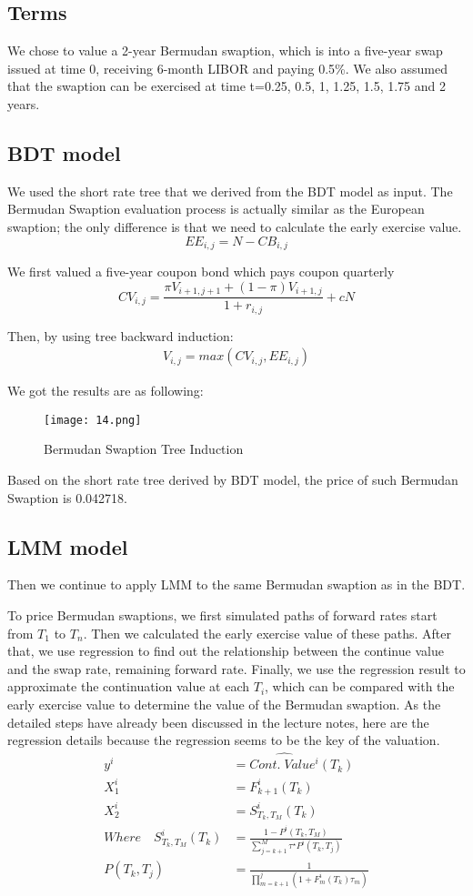 \documentclass[paper = letterpaper, fontsize=12pt]{article}
\begin{document}
\subsection{Terms}
We chose to value a 2-year Bermudan swaption, which is into a five-year swap issued at time 0, receiving 6-month LIBOR and paying 0.5\%. We also assumed that the swaption can be exercised at time t=0.25, 0.5, 1, 1.25, 1.5, 1.75 and 2 years.
\subsection{BDT model}
We used the short rate tree that we derived from the BDT model as input. The Bermudan Swaption evaluation process is actually similar as the European swaption; the only difference is that we need to calculate the early exercise value. 
\[
EE_{i, j} =  N - CB_{i, j}
\]

We first valued a five-year coupon bond which pays coupon quarterly 
\[
CV_{i, j} = \frac{\pi V_{i+1, j+1} + (1-\pi)V_{i+1,j}}{1+r_{i,j}} + cN
\]

Then, by using tree backward induction:
\begin{align}
V_{i, j} = max(CV_{i,j}, EE_{i,j})
\end{align}

We got the results are as following:
\begin{figure}[H]
    \centering
    \texttt{[image: 14.png]}
    \caption{Bermudan Swaption Tree Induction}
\end{figure}

Based on the short rate tree derived by BDT model, the price of such Bermudan Swaption is 0.042718.

\subsection{LMM model}
Then we continue to apply LMM to the same Bermudan swaption as in the BDT.

To price Bermudan swaptions, we first simulated paths of forward rates start from $T_1$ to $T_n$. Then we calculated the early exercise value of these paths. After that, we use regression to find out the relationship between the continue value and the swap rate, remaining forward rate. Finally, we use the regression result to approximate the continuation value at each $T_i$, which can be compared with the early exercise value to determine the value of the Bermudan swaption.
As the detailed steps have already been discussed in the lecture notes, here are the regression details because the regression seems to be the key of the valuation.
\begin{align}
  y^i &= \hat{Cont.\;Value^i}(T_k)\\
  X_1^i &= F_{k+1}^i(T_k)\\ 
  X_2^i &= S_{T_k, T_{M}}^i(T_k)\\
  Where \quad S_{T_k, T_{M}}^i(T_k) &= \frac{1 - P^i(T_k, T_{M})}{\sum_{j=k+1}^{M} \tau^\star P^i(T_k, T_j)}\\
  P(T_k, T_j) &= \frac{1}{\prod_{m = k+1}^j(1+F_m^i(T_k)\tau_m)}
\end{align}
\end{document}
